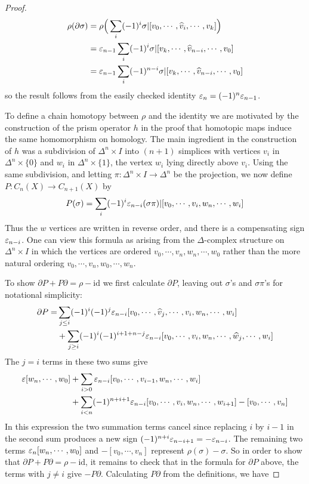 \begin{proof}
\begin{align*}
\rho(\partial\sigma)&=\rho\Big(\sum_i(-1)^i\sigma|[v_0,\cdots,\widehat{v}_i,\cdots,v_k]\Big)\\
&=\varepsilon_{n-1}\sum_{i}(-1)^i\sigma|[v_k,\cdots,\widehat{v}_{n-i},\cdots,v_0]\\
&=\varepsilon_{n-1}\sum_{i}(-1)^{n-i}\sigma|[v_k,\cdots,\widehat{v}_{n-i},\cdots,v_0]
\end{align*}
so the result follows from the easily checked identity $\varepsilon_n=(-1)^n\varepsilon_{n-1}$.\par
To define a chain homotopy between $\rho$ and the identity we are motivated by
the construction of the prism operator $h$ in the proof that homotopic maps induce the same homomorphism on homology. The main ingredient in the construction of $h$ was a subdivision of $\Delta^n\times I$ into $(n+1)$ simplices with vertices $v_i$ in $\Delta^n\times\{0\}$ and $w_i$ in $\Delta^n\times\{1\}$, the vertex $w_i$ lying directly above $v_i$. Using the same subdivision, and letting $\pi:\Delta^n\times I\to\Delta^n$ be the projection, we now define $P:C_n(X)\to C_{n+1}(X)$ by 
\[P(\sigma)=\sum_i(-1)^i\varepsilon_{n-i}(\sigma\pi)|[v_0,\cdots,v_i,w_n,\cdots,w_i]\]
Thus the $w$ vertices are written in reverse order, and there is a compensating sign $\varepsilon_{n-i}$. One can view this formula as arising from the $\Delta$-complex structure on $\Delta^n\times I$ in which the vertices are ordered $v_0,\cdots,v_n,w_n,\cdots,w_0$ rather than the more natural ordering $v_0,\cdots,v_n,w_0,\cdots,w_n$.\par
To show $\partial P+P\partial=\rho-\mathrm{id}$ we first calculate $\partial P$, leaving out $\sigma$'s and $\sigma\pi$'s for notational simplicity:
\begin{align*}
\partial P=&\sum_{j\leq i}(-1)^i(-1)^j\varepsilon_{n-i}[v_0,\cdots,\widehat{v}_j,\cdots,v_i,w_n,\cdots,w_i]\\
&+\sum_{j\geq i}(-1)^i(-1)^{i+1+n-j}\varepsilon_{n-i}[v_0,\cdots,v_i,w_n,\cdots,\widehat{w}_j,\cdots,w_i]
\end{align*}
The $j=i$ terms in these two sums give
\begin{align*}
\varepsilon[w_n,\cdots,w_0]&+\sum_{i>0}\varepsilon_{n-i}[v_0,\cdots,v_{i-1},w_n,\cdots,w_i]\\
&+\sum_{i<n}(-1)^{n+i+1}\varepsilon_{n-i}[v_0,\cdots,v_i,w_{n},\cdots,w_{i+1}]-[v_0,\cdots,v_n]
\end{align*}
In this expression the two summation terms cancel since replacing $i$ by $i-1$ in the second sum produces a new sign $(-1)^{n+i}\varepsilon_{n-i+1}=-\varepsilon_{n-i}$. The remaining two terms $\varepsilon_n[w_n,\cdots,w_0]$ and $-[v_0,\cdots,v_n]$ represent $\rho(\sigma)-\sigma$. So in order to show that $\partial P+P\partial=\rho-\mathrm{id}$, it remains to check that in the formula for $\partial P$ above, the terms with $j\neq i$ give $-P\partial$. Calculating $P\partial$ from the definitions, we have

\end{proof}
